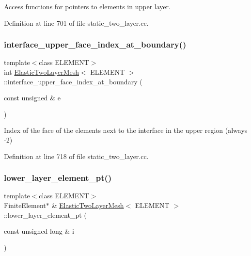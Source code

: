 Access functions for pointers to elements in upper layer. 



Definition at line 701 of file static\+\_\+two\+\_\+layer.\+cc.

\mbox{\label{classElasticTwoLayerMesh_a074aafe34f7dd56566c1a9ff934505d5}} 
\subsubsection{\texorpdfstring{interface\+\_\+upper\+\_\+face\+\_\+index\+\_\+at\+\_\+boundary()}{interface\_upper\_face\_index\_at\_boundary()}}
{\footnotesize\ttfamily template$<$class E\+L\+E\+M\+E\+NT$>$ \\
int \hyperlink{classElasticTwoLayerMesh}{Elastic\+Two\+Layer\+Mesh}$<$ E\+L\+E\+M\+E\+NT $>$\+::interface\+\_\+upper\+\_\+face\+\_\+index\+\_\+at\+\_\+boundary (\begin{DoxyParamCaption}\item[{const unsigned \&}]{e }\end{DoxyParamCaption})\hspace{0.3cm}{\ttfamily [inline]}}



Index of the face of the elements next to the interface in the upper region (always -\/2) 



Definition at line 718 of file static\+\_\+two\+\_\+layer.\+cc.

\mbox{\label{classElasticTwoLayerMesh_a4e6d9b26eecc0487d7b2684ad27b7669}} 
\subsubsection{\texorpdfstring{lower\+\_\+layer\+\_\+element\+\_\+pt()}{lower\_layer\_element\_pt()}}
{\footnotesize\ttfamily template$<$class E\+L\+E\+M\+E\+NT$>$ \\
Finite\+Element$\ast$ \& \hyperlink{classElasticTwoLayerMesh}{Elastic\+Two\+Layer\+Mesh}$<$ E\+L\+E\+M\+E\+NT $>$\+::lower\+\_\+layer\+\_\+element\+\_\+pt (\begin{DoxyParamCaption}\item[{const unsigned long \&}]{i }\end{DoxyParamCaption})\hspace{0.3cm}{\ttfamily [inline]}}



